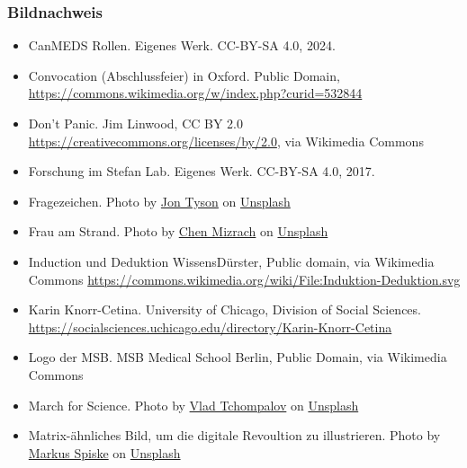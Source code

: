 \documentclass{beamer}
\begin{document}
\begin{frame}
\frametitle{Bildnachweis}

\vfill

\begin{tiny}
\begin{itemize}
\item 
CanMEDS Rollen. Eigenes Werk. CC-BY-SA 4.0, 2024. 

\item 
Convocation (Abschlussfeier) in Oxford. Public Domain, \url{https://commons.wikimedia.org/w/index.php?curid=532844}

\item 
Don't Panic. Jim Linwood, CC BY 2.0 \url{https://creativecommons.org/licenses/by/2.0}, via Wikimedia Commons

\item 
Forschung im Stefan Lab. Eigenes Werk. CC-BY-SA 4.0, 2017.

\item 
Fragezeichen. Photo by \href{https://unsplash.com/@jontyson?utm_content=creditCopyText&utm_medium=referral&utm_source=unsplash}{Jon Tyson} on \href{https://unsplash.com/photos/white-markee-light-hhq1Lxtuwd8?utm_content=creditCopyText&utm_medium=referral&utm_source=unsplash}{Unsplash}
  

\item 
Frau am Strand. Photo by \href{https://unsplash.com/@chenhanozel?utm_content=creditCopyText&utm_medium=referral&utm_source=unsplash}{Chen Mizrach} on \href{https://unsplash.com/photos/woman-sits-on-brown-wooden-beach-chair-jL6PTWI7h18?utm_content=creditCopyText&utm_medium=referral&utm_source=unsplash}{Unsplash}

\item 
Induction und Deduktion WissensDürster, Public domain, via Wikimedia Commons \url{https://commons.wikimedia.org/wiki/File:Induktion-Deduktion.svg}
\item 
Karin Knorr-Cetina. University of Chicago, Division of Social Sciences. \url{https://socialsciences.uchicago.edu/directory/Karin-Knorr-Cetina}

\item
Logo der MSB. MSB Medical School Berlin, Public Domain, via Wikimedia Commons
\item 
March for Science. Photo by \href{https://unsplash.com/@tchompalov?utm_content=creditCopyText&utm_medium=referral&utm_source=unsplash}{Vlad Tchompalov} on \href{https://unsplash.com/photos/group-of-people-with-signages-nKNrOZ5MXZY?utm_content=creditCopyText&utm_medium=referral&utm_source=unsplash}{Unsplash}
\item 
Matrix-ähnliches Bild, um die digitale Revoultion zu illustrieren. Photo by \href{https://unsplash.com/@markusspiske?utm_content=creditCopyText&utm_medium=referral&utm_source=unsplash}{Markus Spiske} on \href{https://unsplash.com/photos/matrix-movie-still-iar-afB0QQw?utm_content=creditCopyText&utm_medium=referral&utm_source=unsplash}{Unsplash}
  


\end{itemize}
\end{tiny}
\end{frame}
\end{document}
